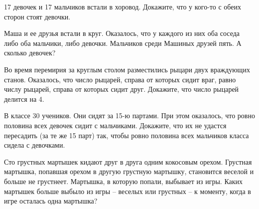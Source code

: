 \begin{thm}
	17 девочек и 17 мальчиков встали в хоровод. Докажите, что у кого-то с обеих сторон стоят девочки.
\end{thm}
\begin{thm}
	Маша и ее друзья встали в круг. Оказалось, что у каждого из них оба соседа либо оба мальчики, либо девочки. Мальчиков среди Машиных друзей пять. А сколько девочек?
\end{thm}
\begin{thm}
	Во время перемирия за круглым столом разместились рыцари двух враждующих станов. Оказалось, что число рыцарей, справа от которых сидит враг, равно числу рыцарей, справа от которых сидит друг. Докажите, что число рыцарей делится на 4.
\end{thm}
\begin{thm}\label{1.31}
	В классе 30 учеников. Они сидят за 15-ю партами. При этом оказалось, что ровно половина всех девочек сидит с мальчиками. Докажите, что их не удастся пересадить (за те же 15 парт) так, чтобы ровно половина всех мальчиков класса сидела с девочками.
\end{thm}
\begin{thm}\label{1.32}
	Сто грустных мартышек кидают друг в друга одним кокосовым орехом. Грустная мартышка, попавшая орехом в другую грустную мартышку, становится веселой и больше не грустнеет. Мартышка, в которую попали, выбывает из игры. Каких мартышек больше выбыло из игры -- веселых или грустных -- к моменту, когда в игре осталась одна мартышка?
\end{thm}
\newpage